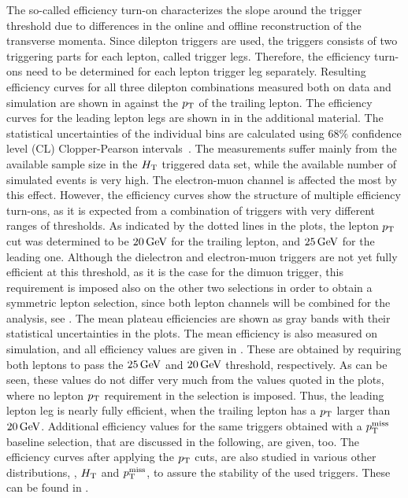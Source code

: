 The so-called efficiency turn-on characterizes the slope around the trigger threshold due to differences in the online and offline reconstruction of the transverse momenta.
Since dilepton triggers are used, the triggers consists of two triggering parts for each lepton, called trigger legs. Therefore, the efficiency turn-ons need to be determined for each lepton trigger leg separately. Resulting efficiency curves for all three dilepton combinations measured both on data and simulation are shown in  against the $p_{\mathrm{T}}$ of the trailing lepton. The efficiency curves for the leading lepton legs are shown in  in the additional material. The statistical uncertainties of the individual bins are calculated using $68\%$ confidence level (CL) Clopper-Pearson intervals~\cite{ClopperPearson}. The measurements suffer mainly from the available sample size in the $H_{\mathrm{T}}$ triggered data set, while the available number of simulated events is very high. The electron-muon channel is affected the most by this effect. However, the efficiency curves show the structure of multiple efficiency turn-ons, as it is expected from a combination of triggers with very different ranges of thresholds. As indicated by the dotted lines in the plots, the lepton $p_{\mathrm{T}}$ cut was determined to be $20\,\text{Ge\hspace{-.08em}V}$ for the trailing lepton, and $25\,\text{Ge\hspace{-.08em}V}$ for the leading one. Although the dielectron and electron-muon triggers are not yet fully efficient at this threshold, as it is the case for the dimuon trigger, this requirement is imposed also on the other two selections in order to obtain a symmetric lepton selection, since both lepton channels will be combined for the analysis, see . The mean plateau efficiencies are shown as gray bands with their statistical uncertainties in the plots. The mean efficiency is also measured on simulation, and all efficiency values are given in . These are obtained by requiring both leptons to pass the $25\,\text{Ge\hspace{-.08em}V}$ and $20\,\text{Ge\hspace{-.08em}V}$ threshold, respectively. As can be seen, these values do not differ very much from the values quoted in the plots, where no lepton $p_{\mathrm{T}}$ requirement in the selection is imposed. Thus, the leading lepton leg is nearly fully efficient, when the trailing lepton has a $p_{\mathrm{T}}$ larger than $20\,\text{Ge\hspace{-.08em}V}$. Additional efficiency values for the same triggers obtained with a $p_{\mathrm{T}}^\text{miss}$ baseline selection, that are discussed in the following, are given, too.
The efficiency curves after applying the $p_{\mathrm{T}}$ cuts, are also studied in various other distributions, \eg, $H_{\mathrm{T}}$ and $p_{\mathrm{T}}^\text{miss}$, to assure the stability of the used triggers. These can be found in .
